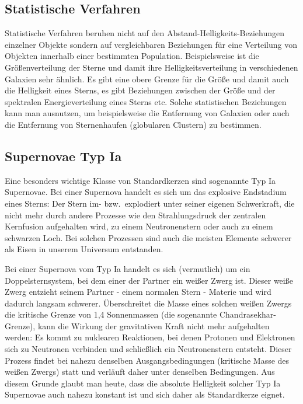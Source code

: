 \subsection{Statistische Verfahren}

Statistische Verfahren beruhen nicht auf den Abstand-Helligkeits-Beziehungen einzelner Objekte
sondern auf vergleichbaren Beziehungen f\"ur eine Verteilung von Objekten innerhalb einer bestimmten
Population. Beispielsweise ist die Gr\"o\ss enverteilung der Sterne und damit ihre Helligkeitsverteilung
in verschiedenen Galaxien sehr \"ahnlich. Es gibt eine obere Grenze f\"ur die Gr\"o\ss e und damit
auch die Helligkeit eines Sterns, es gibt Beziehungen zwischen der Gr\"o\ss e und der spektralen
Energieverteilung eines Sterns etc. Solche statistischen Beziehungen kann man ausnutzen,
um beispielsweise die Entfernung von Galaxien oder auch die Entfernung von Sternenhaufen
(globularen Clustern) zu bestimmen. 

\subsection{Supernovae Typ Ia}

Eine besonders wichtige Klasse von Standardkerzen 
sind sogenannte Typ Ia Supernovae. 
Bei einer Supernova handelt es sich um das explosive Endstadium eines Sterns: Der Stern
im- bzw.\ explodiert unter seiner eigenen Schwerkraft, die nicht mehr durch andere Prozesse
wie den Strahlungsdruck der zentralen Kernfusion aufgehalten wird, zu einem Neutronenstern oder auch zu einem 
schwarzen Loch. Bei solchen Prozessen sind auch die meisten Elemente schwerer
als Eisen in unserem Universum entstanden. 

Bei einer Supernova vom Typ Ia handelt es sich (vermutlich) um ein Doppelsternsystem, bei
dem einer der Partner ein wei\ss er Zwerg ist. Dieser wei\ss e Zwerg entzieht seinem Partner - 
einem normalen Stern - Materie und wird dadurch langsam schwerer. \"Uberschreitet die Masse
eines solchen wei\ss en Zwergs die kritische Grenze von 1,4 Sonnenmassen (die sogenannte
Chandrasekhar-Grenze), 
kann die Wirkung der gravitativen Kraft nicht mehr aufgehalten
werden: Es kommt zu nuklearen Reaktionen, bei denen Protonen und Elektronen sich zu
Neutronen verbinden und schlie\ss lich ein Neutronenstern entsteht. Dieser Prozess findet bei
nahezu denselben Ausgangsbedingungen (kritische Masse des wei\ss en Zwergs) statt und verl\"auft
daher unter denselben Bedingungen. Aus diesem Grunde glaubt man heute, dass die
absolute Helligkeit solcher Typ Ia Supernovae auch nahezu konstant ist und sich daher
als Standardkerze eignet. 

